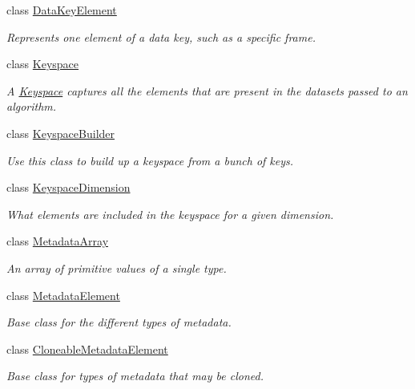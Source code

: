 \begin{DoxyCompactItemize}
class \hyperlink{classBUSBOY_1_1DataKeyElement}{DataKeyElement}
\begin{DoxyCompactList}\small\item\em Represents one element of a data key, such as a specific frame. \item\end{DoxyCompactList}\item 
class \hyperlink{classBUSBOY_1_1Keyspace}{Keyspace}
\begin{DoxyCompactList}\small\item\em A \hyperlink{classBUSBOY_1_1Keyspace}{Keyspace} captures all the elements that are present in the datasets passed to an algorithm. \item\end{DoxyCompactList}\item 
class \hyperlink{classBUSBOY_1_1KeyspaceBuilder}{KeyspaceBuilder}
\begin{DoxyCompactList}\small\item\em Use this class to build up a keyspace from a bunch of keys. \item\end{DoxyCompactList}\item 
class \hyperlink{classBUSBOY_1_1KeyspaceDimension}{KeyspaceDimension}
\begin{DoxyCompactList}\small\item\em What elements are included in the keyspace for a given dimension. \item\end{DoxyCompactList}\item 
class \hyperlink{classBUSBOY_1_1MetadataArray}{MetadataArray}
\begin{DoxyCompactList}\small\item\em An array of primitive values of a single type. \item\end{DoxyCompactList}\item 
class \hyperlink{classBUSBOY_1_1MetadataElement}{MetadataElement}
\begin{DoxyCompactList}\small\item\em Base class for the different types of metadata. \item\end{DoxyCompactList}\item 
class \hyperlink{classBUSBOY_1_1CloneableMetadataElement}{CloneableMetadataElement}
\begin{DoxyCompactList}\small\item\em Base class for types of metadata that may be cloned. \item\end{DoxyCompactList}\item 

\end{DoxyCompactItemize}
